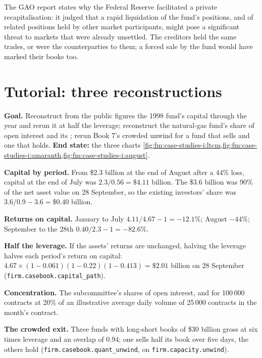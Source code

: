 The GAO report states why the Federal Reserve facilitated a private recapitalisation: it judged that a rapid liquidation of the fund's
positions, and of related positions held by other market participants, might pose a significant threat to markets that were already unsettled. The
creditors held the same trades, or were the counterparties to them; a forced sale by the fund would have marked their books too.

\section{Tutorial: three reconstructions}\label{tut:fm:case-studies-i:tut}

\begin{tutorial}
\textbf{Goal.} Reconstruct from the public figures the 1998 fund's capital through the year and rerun it at half the leverage; reconstruct the
natural-gas fund's share of open interest and its ; rerun Book 7's crowded unwind for a fund that sells and one that holds.
\textbf{End state:} the three charts \cref{fig:fm:case-studies-i:ltcm,fig:fm:case-studies-i:amaranth,fig:fm:case-studies-i:august}.
\begin{tutsteps}
\item \textbf{Capital by period.} From \$2.3 billion at the end of August after a 44\% loss, capital at the end of July was $2.3/0.56=\$4.11$
billion. The \$3.6 billion was 90\% of the net asset value on 28 September, so the existing investors' share was $3.6/0.9-3.6=\$0.40$ billion.
\item \textbf{Returns on capital.} January to July $4.11/4.67-1=-12.1\%$; August $-44\%$; September to the 28th $0.40/2.3-1=-82.6\%$.
\item \textbf{Half the leverage.} If the assets' returns are unchanged, halving the leverage halves each period's return on capital:
$4.67\times(1-0.061)(1-0.22)(1-0.413)=\$2.01$ billion on 28 September (\texttt{firm.casebook.capital\_path}).
\item \textbf{Concentration.} The subcommittee's shares of open interest, and  for 100\,000 contracts at 20\% of an illustrative
average daily volume of 25\,000 contracts in the month's contract.
\item \textbf{The crowded exit.} Three funds with long-short books of \$30 billion gross at six times leverage and an overlap of 0.94; one sells half
its book over five days, the others hold (\texttt{firm.casebook.quant\_unwind}, on \texttt{firm.capacity.unwind}).
\end{tutsteps}
\end{tutorial}

